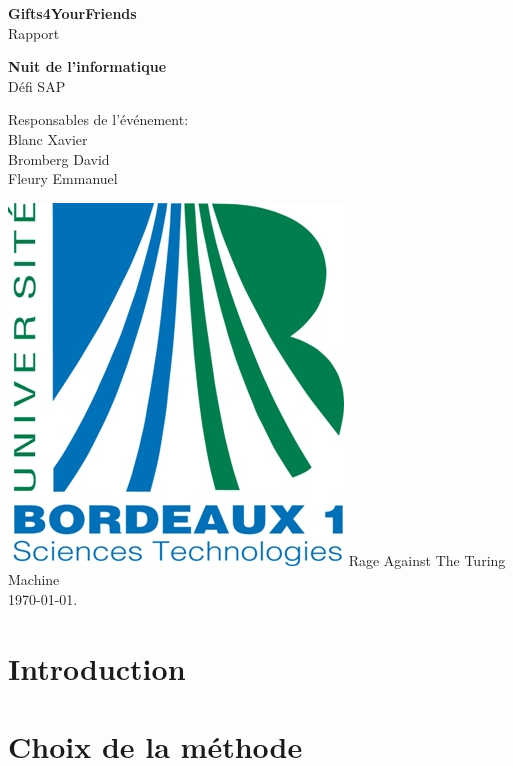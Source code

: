 \documentclass[a4paper,francais,titlepage]{report}
\begin{document}
\pagestyle{fancy}

\begin{titlepage}
 \begin{center}
	\vspace*{3.5cm}
	\Large \textbf{Gifts4YourFriends} \\
	\vspace{0.2cm}
	\small Rapport
	\vspace{2cm}

	\huge \textbf{Nuit de l'informatique} \\
	\vspace{0.3cm}
	\large {Défi SAP}
	\vspace{1.5cm}
 \end{center}
 
 \begin{flushleft}
	\normalsize {\hspace{6cm}Responsables de l'événement: \\ 
				 \hspace{7.0cm} Blanc Xavier \\
				 \hspace{6.7cm} Bromberg David \\
				 \hspace{6.6cm} Fleury Emmanuel}
	\vspace{2cm}
 \end{flushleft}
 
   \begin{center}
   \includegraphics[scale=0.3]{logo_bx1.jpg}
   	\vfill 
   	\vspace{2cm}
	\normalsize {Rage Against The Turing Machine\\}
	\vspace{1.5cm} 
	{\today}.
 \end{center}
\end{titlepage}

\section{Introduction}

\section{Choix de la méthode}
\end{document}
